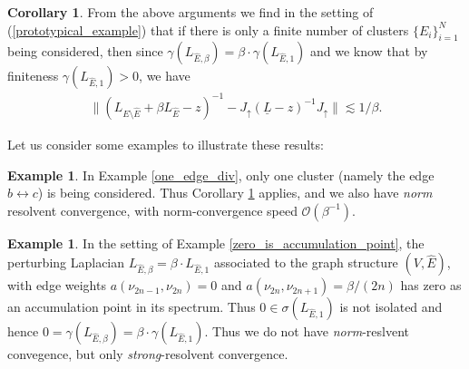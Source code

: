 \documentclass[reqno,12pt,letterpaper]{amsart}
\numberwithin{equation}{section}
\newcommand{\1}{\mathds{1}}
\theoremstyle{definition}
\newtheorem{Ex}[Th]{Example}
\newtheorem{Cor}[Th]{Corollary}
\begin{document}
\medskip

\begin{Cor}\label{finite_dim_cor}
	From the above arguments we find in the setting of (\ref{prototypical_example}) that if there is only a finite number of clusters $\{E_i\}_{i=1}^N$ being considered, then since $\gamma(L_{\hat{E},\beta}) = \beta \cdot \gamma(L_{\hat{E},1})$ and we know that by finiteness $\gamma(L_{\hat{E},1}) > 0$, we have
\begin{align}
	\|
	(L_{E\setminus \hat{E}} + \beta  L_{ \hat{E}}  - z)^{-1} - J_\uparrow (\underline{L} - z)^{-1}J_\uparrow
	\|
	\lesssim 1/\beta.
\end{align}
\end{Cor}


Let us consider some examples to illustrate these results:


\begin{Ex}
In Example \ref{one_edge_div}, only one cluster (namely the edge $b \leftrightarrow c$)  is being considered. Thus Corollary \ref{finite_dim_cor} applies, and we also have \emph{norm} resolvent convergence, with norm-convergence speed $\mathcal{O}(\beta^{-1})$.
\end{Ex}



\begin{Ex}
In the setting of Example \ref{zero_is_accumulation_point}, the perturbing Laplacian $L_{\hat{E},\beta} = \beta \cdot L_{\hat{E},1}$ associated to the graph structure $(V,\hat{E})$, with edge weights $a(\nu_{2n-1},\nu_{2n}) =0$ and $a(\nu_{2n},\nu_{2n+1}) =\beta/(2n)$ has zero as an accumulation point in its spectrum. Thus $0 \in \sigma(L_{\hat{E},1})$ is not isolated and hence $0 = \gamma(L_{\hat{E},\beta}) = \beta \cdot \gamma(L_{\hat{E},1}) $. Thus we do not have \emph{norm}-reslvent convegence, but only \emph{strong}-resolvent convergence.
\end{Ex}
\end{document}
